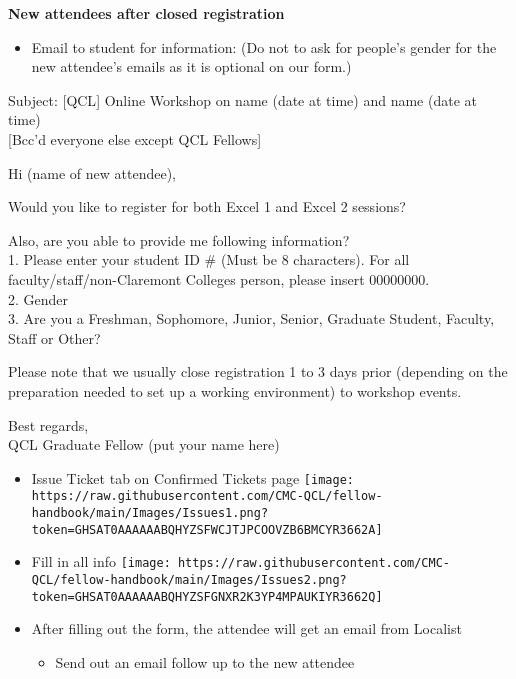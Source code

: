 \documentclass[
]{book}
\providecommand{\tightlist}{%
  \setlength{\itemsep}{0pt}\setlength{\parskip}{0pt}}
\begin{document}
\textbf{New attendees after closed registration}

\begin{itemize}
\tightlist
\item
  Email to student for information: (Do not to ask for people's gender for the new attendee's emails as it is optional on our form.)
\end{itemize}

Subject: {[}QCL{]} Online Workshop on name (date at time) and name (date at time)\\
{[}Bcc'd everyone else except QCL Fellows{]}

Hi (name of new attendee),

Would you like to register for both Excel 1 and Excel 2 sessions?

Also, are you able to provide me following information?\\
1. Please enter your student ID \# (Must be 8 characters). For all faculty/staff/non-Claremont Colleges person, please insert 00000000.\\
2. Gender\\
3. Are you a Freshman, Sophomore, Junior, Senior, Graduate Student, Faculty, Staff or Other?

Please note that we usually close registration 1 to 3 days prior (depending on the preparation needed to set up a working environment) to workshop events.

Best regards,\\
QCL Graduate Fellow (put your name here)

\begin{itemize}
\item
  Issue Ticket tab on Confirmed Tickets page
  \texttt{[image: https://raw.githubusercontent.com/CMC-QCL/fellow-handbook/main/Images/Issues1.png?token=GHSAT0AAAAAABQHYZSFWCJTJPCOOVZB6BMCYR3662A]}
\item
  Fill in all info
  \texttt{[image: https://raw.githubusercontent.com/CMC-QCL/fellow-handbook/main/Images/Issues2.png?token=GHSAT0AAAAAABQHYZSFGNXR2K3YP4MPAUKIYR3662Q]}
\item
  After filling out the form, the attendee will get an email from Localist

  \begin{itemize}
  \tightlist
  \item
    Send out an email follow up to the new attendee
  \end{itemize}
\end{itemize}
\end{document}
